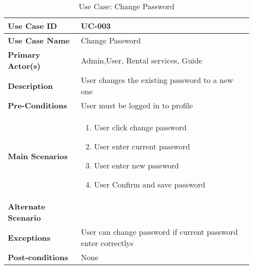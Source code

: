 \begin{table}[ht]
    \centering
    \begin{tabular}{|l|p{}|}
        \hline
        \textbf{Use Case ID} & UC-003 \\
        \hline
        \textbf{Use Case Name} & Change Password \\
        \hline
        \textbf{Primary Actor(s)} & Admin,User, Rental services, Guide \\
        \hline
        \textbf{Description} & User changes the existing password to a new one \\
        \hline
        \textbf{Pre-Conditions} & User must be logged in to profile \\
        \hline
        \textbf{Main Scenarios} & 
        \begin{enumerate}[label=\arabic*.,itemsep=0pt]
            \item User click change password
            \item User enter current password
            \item User enter new password
            \item User Confirm and save password
        \end{enumerate} \\
        \hline
        \textbf{Alternate Scenario} & 
 \\
        \hline
        \textbf{Exceptions} & User can change password if current password enter correctlys \\
        \hline
        \textbf{Post-conditions} & None \\
        \hline
    \end{tabular}
    \label{tab:use-case-login}
    \caption{Use Case: Change Password}
\end{table}



